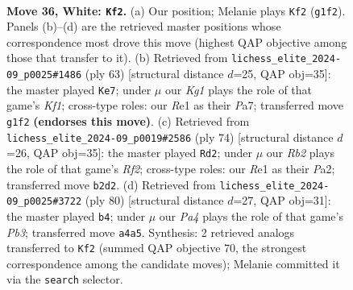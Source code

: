 \documentclass[11pt]{article}
\begin{document}
\clearpage

\begin{figure}[p]\centering
\begin{subfigure}{0.46\textwidth}\centering
\resizebox{\linewidth}{!}{%
\newchessgame
\chessboard[
  setfen={1r6/1p3p2/p3p1k1/8/P3P3/5P1P/1R5P/4R1K1 w - - 1 36},
  showmover=false,
  pgfstyle=straightmove, color=movearrow, markmove={g1-f2}
]}
\caption{}
\end{subfigure}\hfill
\begin{subfigure}{0.46\textwidth}\centering
\resizebox{\linewidth}{!}{%
\newchessgame
\chessboard[
  setfen={2r2k2/pp3pp1/4p3/6pP/P1P3P1/8/5P2/2R2K2 b - - 4 32},
  showmover=false,
  pgfstyle=straightmove, color=movearrow, markmove={f8-e7}
]}
\caption{}
\end{subfigure}
\\[4pt]
\begin{subfigure}{0.46\textwidth}\centering
\resizebox{\linewidth}{!}{%
\newchessgame
\chessboard[
  setfen={8/1p3k2/p1p2p2/6p1/6P1/6P1/PP3RK1/4r3 w - - 2 38},
  showmover=false,
  pgfstyle=straightmove, color=movearrow, markmove={f2-d2}
]}
\caption{}
\end{subfigure}\hfill
\begin{subfigure}{0.46\textwidth}\centering
\resizebox{\linewidth}{!}{%
\newchessgame
\chessboard[
  setfen={2r5/8/2p1k3/3pp1Pp/7P/1PR2PK1/8/8 w - - 2 41},
  showmover=false,
  pgfstyle=straightmove, color=movearrow, markmove={b3-b4}
]}
\caption{}
\end{subfigure}
\caption{\textbf{Move 36, White: \texttt{Kf2}.} (a) Our position; Melanie plays \texttt{Kf2} (\texttt{g1f2}). Panels (b)--(d) are the retrieved master positions whose correspondence most drove this move (highest QAP objective among those that transfer to it). (b) Retrieved from \texttt{lichess\_elite\_2024-09\_p0025\#1486} (ply 63) [structural distance $d$=25, QAP obj=35]: the master played \texttt{Ke7}; under $\mu$ our \emph{Kg1} plays the role of that game's \emph{Kf1}; cross-type roles: our \emph{R}e1 as their \emph{P}a7; transferred move \texttt{g1f2} \textbf{(endorses this move)}. (c) Retrieved from \texttt{lichess\_elite\_2024-09\_p0019\#2586} (ply 74) [structural distance $d$=26, QAP obj=35]: the master played \texttt{Rd2}; under $\mu$ our \emph{Rb2} plays the role of that game's \emph{Rf2}; cross-type roles: our \emph{R}e1 as their \emph{P}a2; transferred move \texttt{b2d2}. (d) Retrieved from \texttt{lichess\_elite\_2024-09\_p0025\#3722} (ply 80) [structural distance $d$=27, QAP obj=31]: the master played \texttt{b4}; under $\mu$ our \emph{Pa4} plays the role of that game's \emph{Pb3}; transferred move \texttt{a4a5}. Synthesis: 2 retrieved analogs transferred to \texttt{Kf2} (summed QAP objective 70, the strongest correspondence among the candidate moves); Melanie committed it via the \texttt{search} selector.}
\label{fig:thought-m70}
\end{figure}
\end{document}
